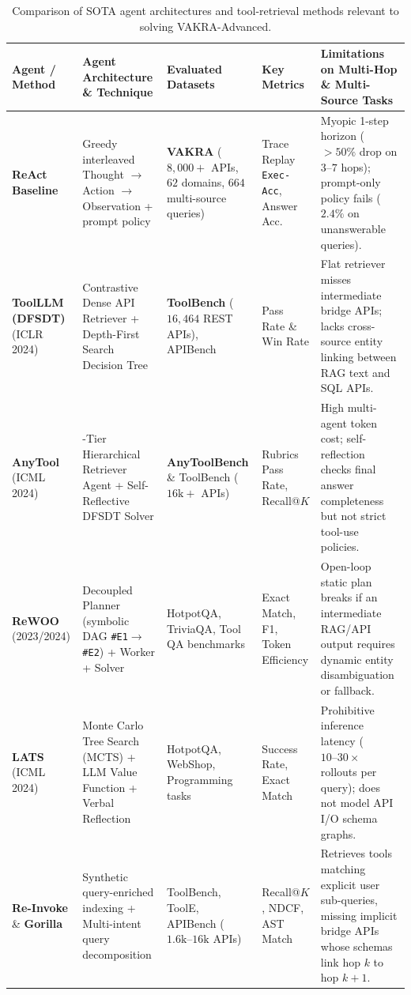 \documentclass[10pt]{article}
\begin{document}
\begin{table}[!htbp]
\centering
\footnotesize
\renewcommand{\arraystretch}{1.12}
\begin{tabularx}{\textwidth}{>{\raggedright\arraybackslash}p{2.2cm} >{\raggedright\arraybackslash}p{3.4cm} >{\raggedright\arraybackslash}p{2.6cm} >{\raggedright\arraybackslash}p{2.2cm} >{\raggedright\arraybackslash}X}
\toprule
\textbf{Agent / Method} & \textbf{Agent Architecture \& Technique} & \textbf{Evaluated Datasets} & \textbf{Key Metrics} & \textbf{Limitations on Multi-Hop \& Multi-Source Tasks} \\
\midrule
\textbf{ReAct Baseline} \cite{yao2023react,naik2026vakra} & Greedy interleaved Thought $\rightarrow$ Action $\rightarrow$ Observation + prompt policy & \textbf{VAKRA} ($8,000+$ APIs, $62$ domains, $664$ multi-source queries) & Trace Replay \texttt{Exec-Acc}, Answer Acc. & Myopic 1-step horizon ($>50\%$ drop on $3\text{--}7$ hops); prompt-only policy fails ($2.4\%$ on unanswerable queries). \\
\midrule
\textbf{ToolLLM (DFSDT)} \cite{qin2024toolllm} (ICLR 2024) & Contrastive Dense API Retriever + Depth-First Search Decision Tree & \textbf{ToolBench} ($16,464$ REST APIs), APIBench & Pass Rate \& Win Rate & Flat retriever misses intermediate bridge APIs; lacks cross-source entity linking between RAG text and SQL APIs. \\
\midrule
\textbf{AnyTool} \cite{du2024anytool} (ICML 2024) & 3-Tier Hierarchical Retriever Agent + Self-Reflective DFSDT Solver & \textbf{AnyToolBench} \& ToolBench ($16\text{k}+$ APIs) & Rubrics Pass Rate, Recall@$K$ & High multi-agent token cost; self-reflection checks final answer completeness but not strict tool-use policies. \\
\midrule
\textbf{ReWOO} \cite{xu2023rewoo} (2023/2024) & Decoupled Planner (symbolic DAG \texttt{\#E1}$\rightarrow$\texttt{\#E2}) + Worker + Solver & HotpotQA, TriviaQA, Tool QA benchmarks & Exact Match, F1, Token Efficiency & Open-loop static plan breaks if an intermediate RAG/API output requires dynamic entity disambiguation or fallback. \\
\midrule
\textbf{LATS} \cite{zhou2024lats} (ICML 2024) & Monte Carlo Tree Search (MCTS) + LLM Value Function + Verbal Reflection & HotpotQA, WebShop, Programming tasks & Success Rate, Exact Match & Prohibitive inference latency ($10\text{--}30\times$ rollouts per query); does not model API I/O schema graphs. \\
\midrule
\textbf{Re-Invoke} \cite{chen2024reinvoke} \& \textbf{Gorilla} \cite{patil2024gorilla} & Synthetic query-enriched indexing + Multi-intent query decomposition & ToolBench, ToolE, APIBench ($1.6\text{k}\text{--}16\text{k}$ APIs) & Recall@$K$, NDCF, AST Match & Retrieves tools matching explicit user sub-queries, missing implicit bridge APIs whose schemas link hop $k$ to hop $k+1$. \\
\bottomrule
\end{tabularx}
\vspace{-0.15cm}
\caption{Comparison of SOTA agent architectures and tool-retrieval methods relevant to solving VAKRA-Advanced.}
\label{tab:sota_comparison}
\vspace{-0.15cm}
\end{table}
\end{document}
